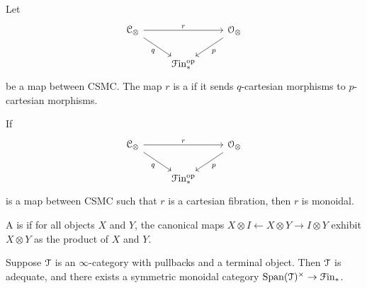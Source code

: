 \documentclass[main.tex]{subfiles}
\begin{document}
\begin{definition}
  Let 
  \begin{equation*}
    \begin{tikzcd}
      \category{C}_{\otimes} 
      \arrow[rr, "r"]
      \arrow[dr, swap, "q"]
      && \category{O}_{\otimes} 
      \arrow[dl, "p"]
      \\
      & \Finp\op
    \end{tikzcd}
  \end{equation*}
  be a map between CSMC. The map $r$ is a  if it sends $q$-cartesian morphisms to $p$-cartesian morphisms.
\end{definition}

\begin{lemma}
  If
  \begin{equation*}
    \begin{tikzcd}
      \category{C}_{\otimes} 
      \arrow[rr, "r"]
      \arrow[dr, swap, "q"]
      && \category{O}_{\otimes} 
      \arrow[dl, "p"]
      \\
      & \Finp\op
    \end{tikzcd}
  \end{equation*}
  is a map between CSMC such that $r$ is a cartesian fibration, then $r$ is monoidal.
\end{lemma}

\begin{definition}
  A  is  if for all objects $X$ and $Y$, the canonical maps $X \otimes I \leftarrow X \otimes Y \to I \otimes Y$ exhibit $X \otimes Y$ as the product of $X$ and $Y$.
\end{definition}

\begin{proposition}
  Suppose $\mathcal{T}$ is an $\infty$-category with pullbacks and a terminal object. Then $\mathcal{T}$ is adequate, and there exists a symmetric monoidal category $\mathrm{Span}(\mathcal{T})^{\times} \to \mathcal{F}\mathrm{in}_{*}$.
\end{proposition}
\end{document}

